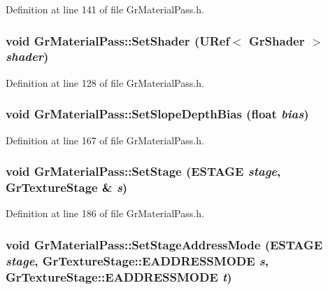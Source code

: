 Definition at line 141 of file GrMaterialPass.h.\hypertarget{class_gr_material_pass_5931c31c1ffda6b191f09f49000f2d11}{
\subsubsection[{SetShader}]{\setlength{\rightskip}{0pt plus 5cm}void GrMaterialPass::SetShader ({\bf URef}$<$ {\bf GrShader} $>$ {\em shader})}}
\label{class_gr_material_pass_5931c31c1ffda6b191f09f49000f2d11}




Definition at line 128 of file GrMaterialPass.h.\hypertarget{class_gr_material_pass_ffa472b516c906654ce2b807fa757ba4}{
\subsubsection[{SetSlopeDepthBias}]{\setlength{\rightskip}{0pt plus 5cm}void GrMaterialPass::SetSlopeDepthBias (float {\em bias})}}
\label{class_gr_material_pass_ffa472b516c906654ce2b807fa757ba4}




Definition at line 167 of file GrMaterialPass.h.\hypertarget{class_gr_material_pass_cd2c6bf8aa2bf5e5e9cb8852d1546c04}{
\subsubsection[{SetStage}]{\setlength{\rightskip}{0pt plus 5cm}void GrMaterialPass::SetStage ({\bf ESTAGE} {\em stage}, \/  {\bf GrTextureStage} \& {\em s})}}
\label{class_gr_material_pass_cd2c6bf8aa2bf5e5e9cb8852d1546c04}




Definition at line 186 of file GrMaterialPass.h.\hypertarget{class_gr_material_pass_1aea66b8b06f6c0c5de9ec7a3e1e5f01}{
\subsubsection[{SetStageAddressMode}]{\setlength{\rightskip}{0pt plus 5cm}void GrMaterialPass::SetStageAddressMode ({\bf ESTAGE} {\em stage}, \/  {\bf GrTextureStage::EADDRESSMODE} {\em s}, \/  {\bf GrTextureStage::EADDRESSMODE} {\em t})}}
\label{class_gr_material_pass_1aea66b8b06f6c0c5de9ec7a3e1e5f01}




